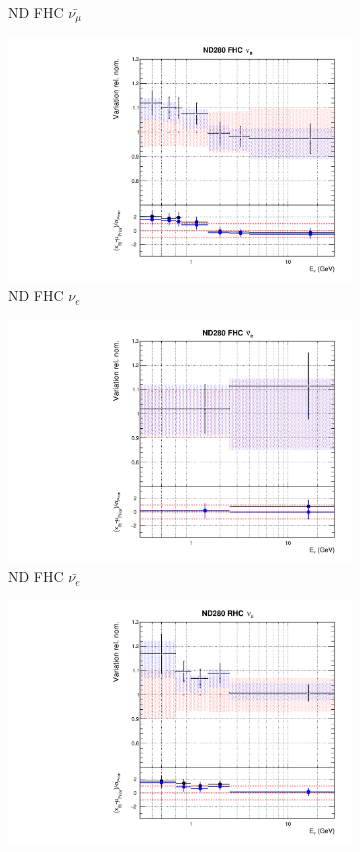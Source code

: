 \begin{figure}
\begin{subfigure}{0.24\textwidth}
  \caption{ND FHC $\bar{\nu_{\mu}}$}
\end{subfigure}
\begin{subfigure}{0.24\textwidth}
  \centering
  \includegraphics[width=0.95\linewidth]{figs/comp5q2vs8q2flux2}
  \caption{ND FHC $\nu_{e}$}
\end{subfigure}
\begin{subfigure}{0.24\textwidth}
  \centering
  \includegraphics[width=0.95\linewidth]{figs/comp5q2vs8q2flux3}
  \caption{ND FHC $\bar{\nu_{e}}$}
\end{subfigure}
\begin{subfigure}{0.24\textwidth}
  \centering
  \includegraphics[width=0.95\linewidth]{figs/comp5q2vs8q2flux4}

\end{subfigure}
\end{figure}
